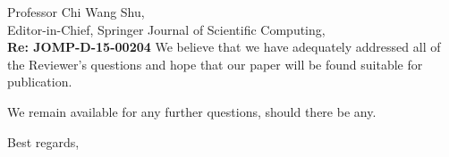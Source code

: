 \documentclass[11pt]{letter}
\begin{document}
\begin{letter}{Professor Chi Wang Shu, \\  Editor-in-Chief, Springer Journal of Scientific Computing,\\
\textbf{Re: JOMP-D-15-00204}}
We believe that we have adequately addressed all of the Reviewer's questions and hope that our paper will be found 
suitable for publication.

%
\bigskip

We remain available for any further questions, should there be any.



\closing{Best regards, }

\end{letter}
\end{document}
